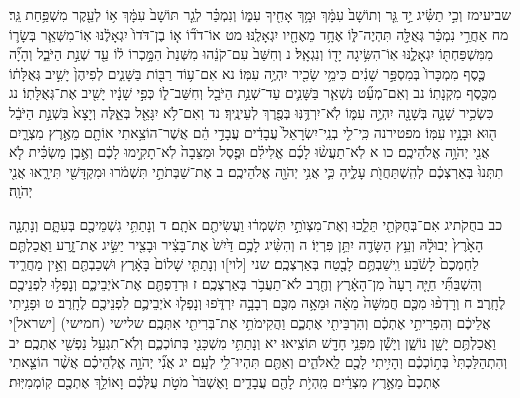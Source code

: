 \documentclass[twoside, openany, parskip=half, 11pt]{book}
\begin{document}
שביעימז וְכִ֣י תַשִּׂ֗יג יַ֣ד גֵּ֤ר וְתוֹשָׁב֙ עִמָּ֔ךְ וּמָ֥ךְ אָחִ֖יךָ עִמּ֑וֹ וְנִמְכַּ֗ר לְגֵ֤ר תּוֹשָׁב֙ עִמָּ֔ךְ א֥וֹ לְעֵ֖קֶר מִשְׁפַּ֥חַת גֵּֽר׃ מח אַחֲרֵ֣י נִמְכַּ֔ר גְּאֻלָּ֖ה תִּהְיֶה־לּ֑וֹ אֶחָ֥ד מֵאֶחָ֖יו יִגְאָלֶֽנּוּ׃ מט אוֹ־דֹד֞וֹ א֤וֹ בֶן־דֹּדוֹ֙ יִגְאָלֶ֔נּוּ אֽוֹ־מִשְּׁאֵ֧ר בְּשָׂר֛וֹ מִמִּשְׁפַּחְתּ֖וֹ יִגְאָלֶ֑נּוּ אֽוֹ־הִשִּׂ֥יגָה יָד֖וֹ וְנִגְאָֽל׃ נ וְחִשַּׁב֙ עִם־קֹנֵ֔הוּ מִשְּׁנַת֙ הִמָּ֣כְרוֹ ל֔וֹ עַ֖ד שְׁנַ֣ת הַיֹּבֵ֑ל וְהָיָ֞ה כֶּ֤סֶף מִמְכָּרוֹ֙ בְּמִסְפַּ֣ר שָׁנִ֔ים כִּימֵ֥י שָׂכִ֖יר יִהְיֶ֥ה עִמּֽוֹ׃ נא אִם־ע֥וֹד רַבּ֖וֹת בַּשָּׁנִ֑ים לְפִיהֶן֙ יָשִׁ֣יב גְּאֻלָּת֔וֹ מִכֶּ֖סֶף מִקְנָתֽוֹ׃ נב וְאִם־מְעַ֞ט נִשְׁאַ֧ר בַּשָּׁנִ֛ים עַד־שְׁנַ֥ת הַיֹּבֵ֖ל וְחִשַּׁב־ל֑וֹ כְּפִ֣י שָׁנָ֔יו יָשִׁ֖יב אֶת־גְּאֻלָּתֽוֹ׃ נג כִּשְׂכִ֥יר שָׁנָ֛ה בְּשָׁנָ֖ה יִהְיֶ֣ה עִמּ֑וֹ לֹֽא־יִרְדֶּ֥נּֽוּ בְּפֶ֖רֶךְ לְעֵינֶֽיךָ׃ נד וְאִם־לֹ֥א יִגָּאֵ֖ל בְּאֵ֑לֶּה וְיָצָא֙ בִּשְׁנַ֣ת הַיֹּבֵ֔ל ה֖וּא וּבָנָ֥יו עִמּֽוֹ׃ מפטירנה כִּֽי־לִ֤י בְנֵֽי־יִשְׂרָאֵל֙ עֲבָדִ֔ים עֲבָדַ֣י הֵ֔ם אֲשֶׁר־הוֹצֵ֥אתִי אוֹתָ֖ם מֵאֶ֣רֶץ מִצְרָ֑יִם אֲנִ֖י יְהֹוָ֥ה אֱלֹהֵיכֶֽם׃ כו א לֹֽא־תַעֲשׂ֨וּ לָכֶ֜ם אֱלִילִ֗ם וּפֶ֤סֶל וּמַצֵּבָה֙ לֹֽא־תָקִ֣ימוּ לָכֶ֔ם וְאֶ֣בֶן מַשְׂכִּ֗ית לֹ֤א תִתְּנוּ֙ בְּאַרְצְכֶ֔ם לְהִֽשְׁתַּחֲוֺ֖ת עָלֶ֑יהָ כִּ֛י אֲנִ֥י יְהֹוָ֖ה אֱלֹהֵיכֶֽם׃ ב אֶת־שַׁבְּתֹתַ֣י תִּשְׁמֹ֔רוּ וּמִקְדָּשִׁ֖י תִּירָ֑אוּ אֲנִ֖י יְהֹוָֽה׃

כב בחֻקֹתיג אִם־בְּחֻקֹּתַ֖י תֵּלֵ֑כוּ וְאֶת־מִצְוֺתַ֣י תִּשְׁמְר֔וּ וַעֲשִׂיתֶ֖ם אֹתָֽם׃ ד וְנָתַתִּ֥י גִשְׁמֵיכֶ֖ם בְּעִתָּ֑ם וְנָתְנָ֤ה הָאָ֙רֶץ֙ יְבוּלָ֔הּ וְעֵ֥ץ הַשָּׂדֶ֖ה יִתֵּ֥ן פִּרְיֽוֹ׃ ה וְהִשִּׂ֨יג לָכֶ֥ם דַּ֙יִשׁ֙ אֶת־בָּצִ֔יר וּבָצִ֖יר יַשִּׂ֣יג אֶת־זָ֑רַע וַאֲכַלְתֶּ֤ם לַחְמְכֶם֙ לָשֹׂ֔בַע וִֽישַׁבְתֶּ֥ם לָבֶ֖טַח בְּאַרְצְכֶֽם׃ שני [לוי]ו וְנָתַתִּ֤י שָׁלוֹם֙ בָּאָ֔רֶץ וּשְׁכַבְתֶּ֖ם וְאֵ֣ין מַחֲרִ֑יד וְהִשְׁבַּתִּ֞י חַיָּ֤ה רָעָה֙ מִן־הָאָ֔רֶץ וְחֶ֖רֶב לֹא־תַעֲבֹ֥ר בְּאַרְצְכֶֽם׃ ז וּרְדַפְתֶּ֖ם אֶת־אֹיְבֵיכֶ֑ם וְנָפְל֥וּ לִפְנֵיכֶ֖ם לֶחָֽרֶב׃ ח וְרָדְפ֨וּ מִכֶּ֤ם חֲמִשָּׁה֙ מֵאָ֔ה וּמֵאָ֥ה מִכֶּ֖ם רְבָבָ֣ה יִרְדֹּ֑פוּ וְנָפְל֧וּ אֹיְבֵיכֶ֛ם לִפְנֵיכֶ֖ם לֶחָֽרֶב׃ ט וּפָנִ֣יתִי אֲלֵיכֶ֔ם וְהִפְרֵיתִ֣י אֶתְכֶ֔ם וְהִרְבֵּיתִ֖י אֶתְכֶ֑ם וַהֲקִימֹתִ֥י אֶת־בְּרִיתִ֖י אִתְּכֶֽם׃ שלישי (חמישי) [ישראל]י וַאֲכַלְתֶּ֥ם יָשָׁ֖ן נוֹשָׁ֑ן וְיָשָׁ֕ן מִפְּנֵ֥י חָדָ֖שׁ תּוֹצִֽיאוּ׃ יא וְנָתַתִּ֥י מִשְׁכָּנִ֖י בְּתוֹכְכֶ֑ם וְלֹֽא־תִגְעַ֥ל נַפְשִׁ֖י אֶתְכֶֽם׃ יב וְהִתְהַלַּכְתִּי֙ בְּת֣וֹכְכֶ֔ם וְהָיִ֥יתִי לָכֶ֖ם לֵֽאלֹהִ֑ים וְאַתֶּ֖ם תִּהְיוּ־לִ֥י לְעָֽם׃ יג אֲנִ֞י יְהֹוָ֣ה אֱלֹֽהֵיכֶ֗ם אֲשֶׁ֨ר הוֹצֵ֤אתִי אֶתְכֶם֙ מֵאֶ֣רֶץ מִצְרַ֔יִם מִֽהְיֹ֥ת לָהֶ֖ם עֲבָדִ֑ים וָאֶשְׁבֹּר֙ מֹטֹ֣ת עֻלְּכֶ֔ם וָאוֹלֵ֥ךְ אֶתְכֶ֖ם קֽוֹמְמִיּֽוּת׃
\end{document}
